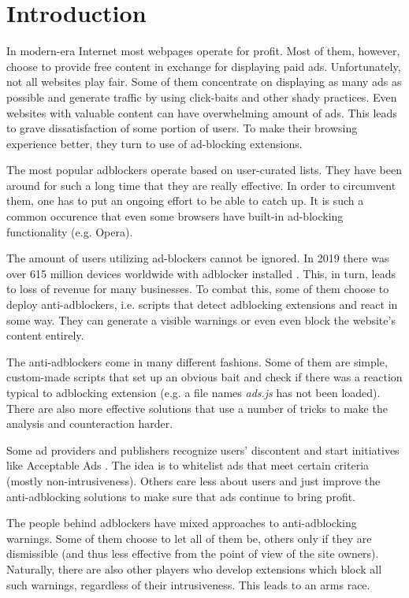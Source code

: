 \chapter*{Introduction}

In modern-era Internet most webpages operate for profit. Most of them, however, choose to provide free content
in exchange for displaying paid ads. Unfortunately, not all websites play fair. Some of them
concentrate on displaying as many ads as possible and generate traffic by using click-baits 
and other shady practices. Even websites with valuable content can have overwhelming amount 
of ads. This leads to grave dissatisfaction of some portion of users. To make their browsing experience better,
they turn to use of ad-blocking extensions.

The most popular adblockers operate based on user-curated lists. They have been around for such a long
time that they are really effective. In order to circumvent them, one has to put an ongoing effort to be able
to catch up. It is such a common occurence that even some browsers have built-in ad-blocking
functionality (e.g. Opera).

The amount of users utilizing ad-blockers cannot be ignored. In 2019 there was over 615 million devices worldwide
with adblocker installed \cite{pagefair:adblock-report}. This, in turn, leads to loss of revenue for many businesses.
To combat this, some of them choose to deploy anti-adblockers, i.e. scripts that detect adblocking extensions
and react in some way. They can generate a visible warnings or even even block the website's content entirely.

The anti-adblockers come in many different fashions. Some of them are simple, custom-made scripts that 
set up an obvious bait and check if there was a reaction typical to adblocking extension (e.g. a file names \emph{ads.js}
has not been loaded). There are also more effective solutions that use a number of tricks to make the analysis
and counteraction harder.

Some ad providers and publishers recognize users' discontent and start initiatives like Acceptable Ads \cite{acceptableads}.
The idea is to whitelist ads that meet certain criteria (mostly non-intrusiveness).
Others care less about users and just improve the anti-adblocking solutions 
to make sure that ads continue to bring profit.

The people behind adblockers have mixed approaches to anti-adblocking warnings.
Some of them choose to let all of them be, others only if they are dismissible (and thus 
less effective from the point of view of the site owners). Naturally, there are also other 
players who develop extensions which block all such warnings, regardless of their
intrusiveness. This leads to an arms race.

